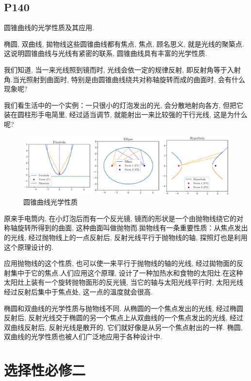 \documentclass{book}
\begin{document}
    \section{\textcolor[rgb]{0.11,0.65,0.52}{P140}}

    圆锥曲线的光学性质及其应用.

    椭圆, 双曲线, 拋物线这些圆锥曲线都有焦点, 焦点, 顾名思义, 就是光线的聚築点. 这说明圆锥曲线与光线有紧密的联系, 圆锥曲线具有丰富的光学性质.

    我们知道, 当一来光线照到镜而时, 光线会依一定的规律反射, 即反射角等于入射角.当光照射到曲面时, 特别是由圆锥曲线绕共对称轴旋转而成的曲面时, 会有什么现象呢?

    我们看生活中的一个实例：一只很小的灯泡发出的光, 会分散地射向各方, 但把它装在圆柱形手电简里, 经过适当调节, 就能射出一来比较强的干行光线, 这是为什么呢?

    \begin{figure}[htbp]
        \centering
        \includegraphics[width=\textwidth]{img/ConicCurveLightAttribute.eps}
        \caption{圆锥曲线光学性质}
    \end{figure}

    原来手电筒内, 在小灯泡后而有一个反光镜, 镜而的形状是一个由抛物线绕它的对称轴旋转所得到的曲面, 这种曲面叫做抛物而.拋物线有一条重要性质：从焦点发出的光线, 经过抛物线上的一点反射后, 反射光线平行于抛物线的轴, 探照灯也是利用这个原理设计的.

    应用抛物线的这个性质, 也可以使一来平行于抛物线的轴的光线, 经过拋物面的反射集中于它的焦点.人们应用这个原理, 设计了一种加热水和食物的太阳灶.在这种太阳灶上装有一个旋转抛物面形的反光镜, 当它的轴与太阳光线平行时, 太阳光线经过反射后集中于焦点处, 这一点的溫度就会很高.

    椭圆和双曲线的光学性质与抛物线不同. 从椭圆的一个焦点发出的光线, 经过椭圆反射后, 反射光线交于椭圆的另一个焦点上从双曲线的一个焦点发出的光线, 经过双曲线反射后, 反射光线是散开的, 它们就好像是从另一个焦点射出的一样. 椭圆, 双曲线的光学性质也被人们广泛地应用于各种设计中.

    \chapter{选择性必修二}
\end{document}
